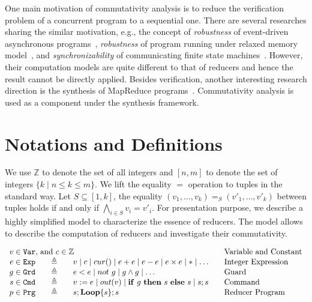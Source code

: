 \documentclass{llncs}
\newcommand{\Var}{\mathtt{Var}}
\newcommand{\Exp}{\mathtt{Exp}}
\newcommand{\Cmd}{\mathtt{Cmd}}
\newcommand{\Grd}{\mathtt{Grd}}
\newcommand{\Prg}{\mathtt{Prg}}
\newcommand{\cur}{cur()}
\newcommand{\ite}[3]{
	 \ifmmode
	 \mathbf{if}\ #1 \ \mathbf{then}\ #2\  \mathbf{else}\ #3
	 \else
	 \textbf{if}\ #1 \ \textbf{then}\ #2\  \textbf{else}\ #3
	 \fi}
\newcommand{\rloop}{
	\ifmmode
	\mathbf{Loop}
	\else
	\textbf{Loop}
	\fi}
\newcommand{\Z}{\mathbb{Z}}
\begin{document}
One main motivation of commutativity analysis is to reduce the verification problem of a concurrent program to a sequential one. There are several researches sharing the similar motivation, e.g., the concept of \emph{robustness} of event-driven asynchronous programs~\cite{ahmed2017:robustness}, \emph{robustness} of program running under relaxed memory model~\cite{ahmed2013:robustness,AbdullaACLR13,AbdullaACLR12}, and \emph{synchronizability} of communicating finite state machines~\cite{FinkelL17,basu2012synchronizability,basu2011choreography}. However, their computation models are quite different to that of reducers and hence the result cannot be directly applied. Besides verification, another interesting research direction is the synthesis of MapReduce programs~\cite{SmithA16}. Commutativity analysis is used as a component under the synthesis framework.

\section{Notations and Definitions}
\label{section:integer-reducers}
We use $\Z$ to denote the set of all integers and $[n,m]$ to denote the set of integers $\{k\mid n \leq k\leq m\}$. 
We lift the equality $=$ operation to tuples in the standard way.
Let $S\subseteq [1,k]$, the equality $(v_1,\ldots,v_k)=_{S} (v'_1,\ldots,v'_k)$ between tuples holds if and only if $\bigwedge_{i\in S} v_i=v'_i$.
For presentation purpose, we describe a highly simplified model to characterize the essence of reducers. The model allows to describe the computation of reducers and investigate their commutativity.

\begin{equation*}
\begin{array}{rclcl}
\multicolumn{3}{l}{v\in \Var\mbox{, and }c \in \Z}&&\textmd{Variable and Constant}\\
e \in \Exp    &\ \ \  {\triangleq}\ \ \   & v \mid c \mid \cur \mid e + e \mid e - e \mid e \times e \mid *\mid\ldots & &\textmd{Integer Expression}\\
g\in \Grd  & {\triangleq}  & e < e \mid not\ g \mid g \wedge g  \mid \ldots& & \textmd{Guard}\\
s\in \Cmd  & {\triangleq}  & v:= e \mid out(v) \mid \ite{g}{s}{s} \mid s;s && \textmd{Command}\\
p\in \Prg  & {\triangleq}  & s;\rloop\{s\};s&& \textmd{Reducer Program}\\
\end{array}
\end{equation*}
\end{document}
